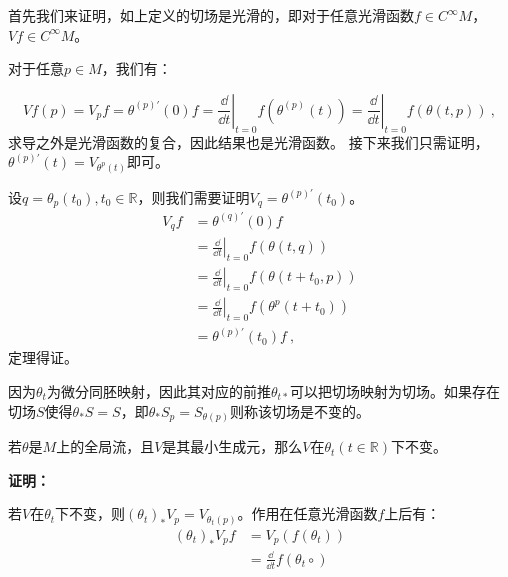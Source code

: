 首先我们来证明，如上定义的切场是光滑的，即对于任意光滑函数$f\in C^{\infty}M$，$Vf\in C^{\infty}M$。

对于任意$p\in M$，我们有：

\begin{equation}
Vf(p)=V_pf=\theta^{(p)\prime}(0)f=\left.\frac{\dd}{\dd t}\right|_{t=0} f\left(\theta^{(p)}(t)\right)=\left.\frac{\dd}{\dd t}\right|_{t=0} f(\theta(t, p)) ~,
\end{equation}
求导之外是光滑函数的复合，因此结果也是光滑函数。
接下来我们只需证明，$\theta^{(p) \prime}(t)=V_{\theta^{p}(t)}$即可。

设$q=\theta_p(t_0),t_0\in \mathbb R$，则我们需要证明$V_q=\theta^{(p)\prime}(t_0)$。
\begin{equation}
\begin{aligned}
V_qf&=\theta^{(q)\prime}(0)f\\
&=\left.\frac{\dd}{\dd t}\right|_{t=0} f(\theta(t, q))\\
&=\left.\frac{\dd}{\dd t}\right|_{t=0} f(\theta(t+t_0, p))\\
&=\left.\frac{\dd}{\dd t}\right|_{t=0} f(\theta^p(t+t_0))\\
&=\theta^{(p)\prime}(t_0)f~,
\end{aligned}
\end{equation}
定理得证。

因为$\theta_t$为微分同胚映射，因此其对应的前推$\theta_{t*}$可以把切场映射为切场。如果存在切场$S$使得$\theta_*S=S$，即$\theta_*S_p=S_{\theta(p)}
$则称该切场是不变的。

\begin{theorem}{}
若$\theta$是$M$上的全局流，且$V$是其最小生成元，那么$V$在$\theta_t(t\in \mathbb R)$下不变。
\end{theorem}
\textbf{证明：}

若$V$在$\theta_t$下不变，则$(\theta_t)_*V_p=V_{\theta_t(p)}$。作用在任意光滑函数$f$上后有：
\begin{equation}
\begin{aligned}
(\theta_t)_*V_pf&=V_p(f(\theta_t))\\
&=\frac{\dd}{\dd t}f(\theta_t\circ )
\end{aligned}
\end{equation}

